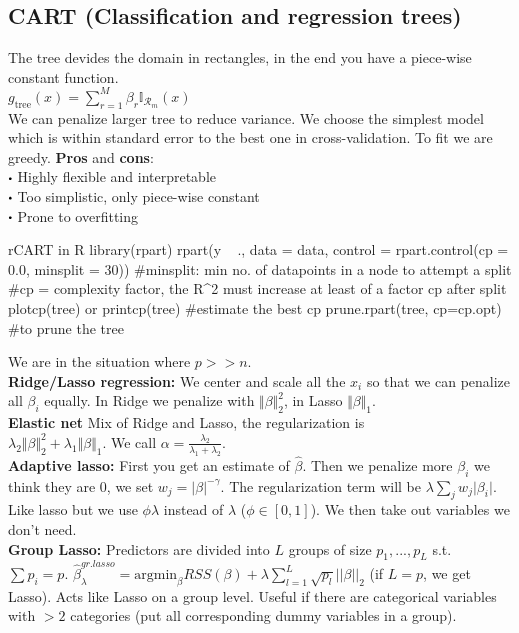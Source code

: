 \subsection{CART (Classification and regression trees)}
The tree devides the domain in rectangles, in the end you have a piece-wise constant function. \\
$g_{\text{tree}}(x)=\sum_{r=1}^M\beta_r \mathbb{I}_{\mathcal{R}_m}(x)$\\
We can penalize larger tree to reduce variance. We choose the simplest model which is within standard error to the best one in cross-validation.
To fit we are greedy. \textbf{Pros} and \textbf{cons}:\\
$\bigcdot$ Highly flexible and interpretable\\
$\bigcdot$ Too simplistic, only piece-wise constant\\
$\bigcdot$ Prone to overfitting 
\begin{codebox}{r}{CART in R}
library(rpart)
rpart(y ~ ., data = data, control = rpart.control(cp = 0.0, minsplit = 30)) #minsplit: min no. of datapoints in a node to attempt a split
#cp = complexity factor, the R^2 must increase at least of a factor cp after split 
plotcp(tree) or printcp(tree) #estimate the best cp
prune.rpart(tree, cp=cp.opt) #to prune the tree
\end{codebox}
We are in the situation where $p>>n$.\\
\textbf{Ridge/Lasso regression:} We center and scale all the $x_i$ so that we can penalize all $\beta_i$ equally. In Ridge we penalize with $\Vert\beta\Vert_2^2$, in Lasso $\Vert\beta\Vert_1$.\\
\textbf{Elastic net} Mix of Ridge and Lasso, the regularization is\\
$\lambda_2\Vert\beta\Vert_2^2+\lambda_1\Vert\beta\Vert_1$. We call $\alpha = \frac{\lambda_2}{\lambda_1+\lambda_2}$. \\




\textbf{Adaptive lasso:} First you get an estimate of $\hat \beta$. Then we penalize more $\beta_i$ we think they are $0$, we set $w_j=\vert\beta\vert^{-\gamma}$. The regularization term will be $\lambda\sum_j w_j\vert\beta_i\vert$. \\
 Like lasso but we use $\phi\lambda$ instead of $\lambda$ ($\phi \in [0,1]$). We then take out variables we don't need.\\
\textbf{Group Lasso:} Predictors are divided into $L$ groups of size $p_1, ..., p_L$ s.t. $\sum p_i = p$. $\hat\beta_\lambda^{gr.lasso}=\text{argmin}_\beta RSS(\beta)+\lambda \sum_{l=1}^L \sqrt{p_l} ||\beta||_2$ (if $L=p$, we get Lasso). Acts like Lasso on a group level. Useful if there are categorical variables with $>2$ categories (put all corresponding dummy variables in a group).\\

